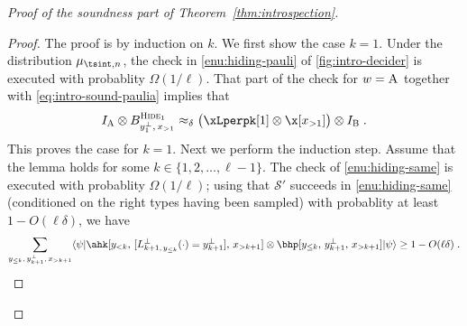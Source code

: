 \documentclass[11pt]{article}
\theoremstyle{definition}
\newcommand{\ket}[1]{|#1\rangle}
\newcommand{\bra}[1]{\langle#1|}
\newcommand{\Id}{\ensuremath{I}}
\newcommand{\ia}{\Id_\alice}
\newcommand{\ib}{\Id_\bob}
\newcommand{\strategy}{\mathscr{S}}
\newcommand{\labelstyle}[1]{\ensuremath{\textsc{#1}}\xspace}
\newcommand{\alice}{\labelstyle{A}}
\newcommand{\bob}{\labelstyle{B}}
\newcommand{\typestyle}[1]{\ensuremath{\textsc{#1}}\xspace}
\newcommand{\Hide}[1]{\typestyle{Hide}_{#1}}
\begin{document}
\begin{proof}[Proof of the soundness part of Theorem~\ref{thm:introspection}]
  \begin{proof}
    The proof is by induction on $k$. We first show the case $k=1$.
    Under the distribution $\mu_{\tsint,n}$, the check in
    \cref{enu:hiding-pauli} of \cref{fig:intro-decider} is executed with
    probablity $\Omega(1/\ell)$. That part of the check for $w=\alice$ together
    with \cref{eq:intro-sound-paulia} implies that
    \begin{equation}
      \label{eq:base-case-hide}
      \ia \otimes B^{\Hide{1}}_{y_1^\perp,\, x_{>1}} \approx_\delta \bigl(
      \xLperpk[1] \otimes \x[x_{>1}] \bigr) \otimes \ib\;.
    \end{equation}
    This proves the case for $k=1$.
    Next we perform the induction step.
    Assume that the lemma holds for some $k \in \{1, 2, \ldots, \ell-1\}$.
    The check of \cref{enu:hiding-same} is executed with probablity
    $\Omega(1/\ell)$; using that $\strategy'$ succeeds in \cref{enu:hiding-same}
    (conditioned on the right types having been sampled) with probablity at least $1 - O(\ell
    \delta)$, we have
    \begin{equation*}
      \sum_{y_{\le k},\, y^\perp_{k+1},\, x_{>k+1}}
      \bra{\psi} \ahk[{y_{<k},\, [L^\perp_{k+1,\, y_{\le k}}
      (\cdot ) = y^\perp_{k+1}],\, x_{>k+1}}] \otimes \bhp[y_{\le k},\,
      y^\perp_{k+1},\, x_{>k+1}] \ket{\psi} \ge 1 - O(\ell \delta)\;.
    \end{equation*}


\end{proof}
\end{proof}
\end{document}
